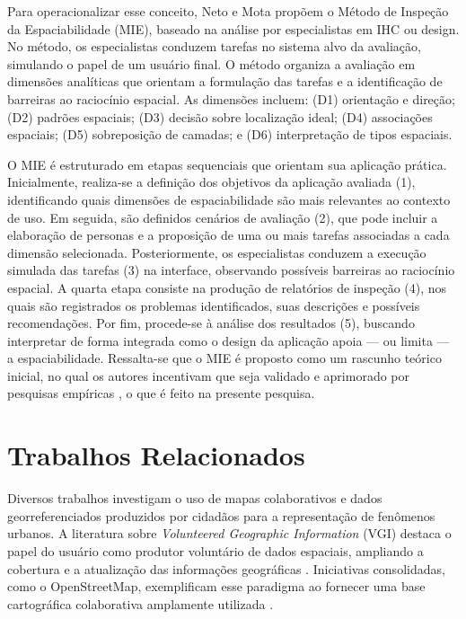 \documentclass[12pt]{article}
\begin{document}
Para operacionalizar esse conceito, Neto e Mota \cite{neto:ihc} propõem o Método de Inspeção da Espaciabilidade (MIE), baseado na análise por especialistas em IHC ou design. No método, os especialistas conduzem tarefas no sistema alvo da avaliação, simulando o papel de um usuário final. O método organiza a avaliação em dimensões analíticas que orientam a formulação das tarefas e a identificação de barreiras ao raciocínio espacial. As dimensões incluem: (D1) orientação e direção; (D2) padrões espaciais; (D3) decisão sobre localização ideal; (D4) associações espaciais; (D5) sobreposição de camadas; e (D6) interpretação de tipos espaciais.



O MIE é estruturado em etapas sequenciais que orientam sua aplicação prática. Inicialmente, realiza-se a definição dos objetivos da aplicação avaliada (1), identificando quais dimensões de espaciabilidade são mais relevantes ao contexto de uso. Em seguida, são definidos cenários de avaliação (2), que pode incluir a elaboração de personas e a proposição de uma ou mais tarefas associadas a cada dimensão selecionada. Posteriormente, os especialistas conduzem a execução simulada das tarefas (3) na interface, observando possíveis barreiras ao raciocínio espacial. A quarta etapa consiste na produção de relatórios de inspeção (4), nos quais são registrados os problemas identificados, suas descrições e possíveis recomendações. Por fim, procede-se à análise dos resultados (5), buscando interpretar de forma integrada como o design da aplicação apoia — ou limita — a espaciabilidade. Ressalta-se que o MIE é proposto como um rascunho teórico inicial, no qual os autores incentivam que seja validado e aprimorado por pesquisas empíricas \cite{neto:ihc}, o que é feito na presente pesquisa.





\section{Trabalhos Relacionados}

Diversos trabalhos investigam o uso de mapas colaborativos e dados georreferenciados produzidos por cidadãos para a representação de fenômenos urbanos. A literatura sobre \textit{Volunteered Geographic Information} (VGI) destaca o papel do usuário como produtor voluntário de dados espaciais, ampliando a cobertura e a atualização das informações geográficas \cite{sui:2013}. Iniciativas consolidadas, como o OpenStreetMap, exemplificam esse paradigma ao fornecer uma base cartográfica colaborativa amplamente utilizada \cite{haklay:2012}.
\end{document}
